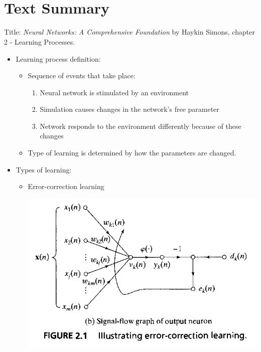 \documentclass[paper=a4, fontsize=11pt]{scrartcl} %
\title{\hmwkClass \\
       \hmwkTitle}
\author{\hmwkAuthorFullName}
\date{\hmwkDueDate}
\begin{document}
    \maketitle
    \thispagestyle{fancy} %

    \section*{Text Summary}

    Title: \textit{Neural Networks: A Comprehensive Foundation} by Haykin Simons, chapter 2 - Learning Processes.

    \begin{itemize}
        \item Learning process definition:
        \begin{itemize}
            \item Sequence of events that take place:
            \begin{enumerate}
                \item Neural network is stimulated by an environment
                \item Simulation causes changes in the network's free parameter
                \item Network responds to the environment differently because of these changes
            \end{enumerate}
            \item Type of learning is determined by how the parameters are changed.
        \end{itemize}

        \item Types of learning:
        \begin{itemize}
            \item Error-correction learning
            \begin{center}
                \includegraphics[width=14.0cm]{../images/Haykin-NN-figure2-1.png} %
            \end{center}


\end{itemize}
\end{itemize}
\end{document}
